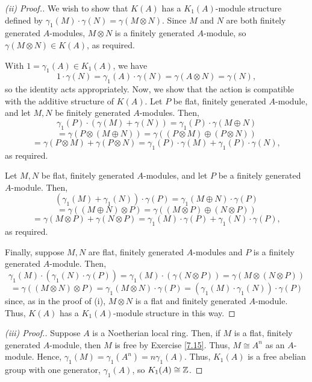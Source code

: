 \begin{proof}[(ii) Proof.]
We wish to show that $K(A)$ has a $K_1(A)$-module structure defined by $\gamma_1(M) \cdot \gamma(N) = \gamma(M \otimes N)$. Since $M$ and $N$ are both finitely generated $A$-modules,
$M \otimes N$ is a finitely generated $A$-module, so $\gamma(M \otimes N) \in K(A)$, as required.

With $1 = \gamma_1(A) \in K_1(A)$, we have
$$1 \cdot \gamma(N) = \gamma_1(A) \cdot \gamma(N) = \gamma(A \otimes N) = \gamma(N),$$
so the identity acts appropriately. Now, we show that the action is compatible with the additive structure of $K(A)$.
Let $P$ be flat, finitely generated $A$-module, and let $M,N$ be finitely generated $A$-modules. Then,
$$\gamma_1(P) \cdot (\gamma(M) + \gamma(N)) = \gamma_1(P) \cdot \gamma(M \oplus N)$$ 
$$= \gamma(P \otimes (M \oplus N)) = \gamma((P \otimes M) \oplus (P \otimes N))$$ 
$$= \gamma(P \otimes M) + \gamma(P \otimes N) = \gamma_1(P)\cdot \gamma(M) + \gamma_1(P) \cdot \gamma(N),$$
as required.

Let $M,N$ be flat, finitely generated $A$-modules, and let $P$ be a finitely generated $A$-module. Then,
$$(\gamma_1(M) + \gamma_1(N)) \cdot \gamma(P) = \gamma_1(M \oplus N) \cdot \gamma(P)$$ 
$$= \gamma((M \oplus N) \otimes P) = \gamma((M \otimes P) \oplus (N \otimes P))$$ 
$$= \gamma(M \otimes P) + \gamma(N \otimes P) = \gamma_1(M) \cdot \gamma(P) + \gamma_1(N) \cdot \gamma(P),$$
as required.

Finally, suppose $M,N$ are flat, finitely generated $A$-modules and $P$ is a finitely generated $A$-module. Then,
$$\gamma_1(M)\cdot(\gamma_1(N) \cdot \gamma(P)) = \gamma_1(M)\cdot(\gamma(N \otimes P)) = \gamma(M \otimes (N \otimes P))$$
$$= \gamma((M \otimes N) \otimes P) = \gamma_1(M \otimes N) \cdot \gamma(P) = (\gamma_1(M) \cdot \gamma_1(N)) \cdot \gamma(P)$$
since, as in the proof of (i), $M \otimes N$ is a flat and finitely generated $A$-module. Thus, $K(A)$ has a $K_1(A)$-module structure
in this way.
\end{proof}

\begin{proof}[(iii) Proof.]
Suppose $A$ is a Noetherian local ring. Then, if $M$ is a flat, finitely generated $A$-module, then $M$ is free by Exercise \ref{7.15}. Thus, $M \cong A^n$ as an 
$A$-module. Hence, $\gamma_1(M) = \gamma_1(A^n) = n\gamma_1(A)$. Thus, $K_1(A)$ is a free abelian group with one generator, $\gamma_1(A)$, so $K_1(A) \cong \mathbb{Z}$.
\end{proof}

